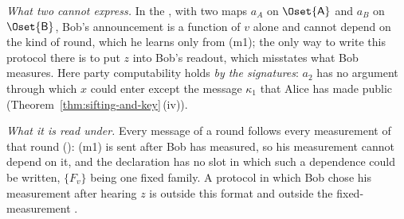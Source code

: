 \begin{example}
\emph{What two  cannot express.} In
the , with two maps $a_A$ on $\Oset{\mathsf A}$ and $a_B$
on $\Oset{\mathsf B}$, Bob's announcement is a function of $v$ alone and cannot
depend on the kind of round, which he learns only from (m1); the only way to
write this protocol there is to put $z$ into Bob's readout, which misstates
what Bob measures. Here party computability holds \emph{by the signatures}:
$a_2$ has no argument through which $x$ could enter except the message
$\kappa_1$ that Alice has made public (Theorem~\ref{thm:sifting-and-key}\,(iv)).

\emph{What it is read under.} Every message of a round follows every
measurement of that round (): (m1) is sent after Bob
has measured, so his measurement cannot depend on it, and the declaration has
no slot in which such a dependence could be written, $\{F_v\}$ being one fixed
family. A protocol in which Bob chose his measurement after hearing $z$ is
outside this format and outside the fixed-measurement .
\end{example}
